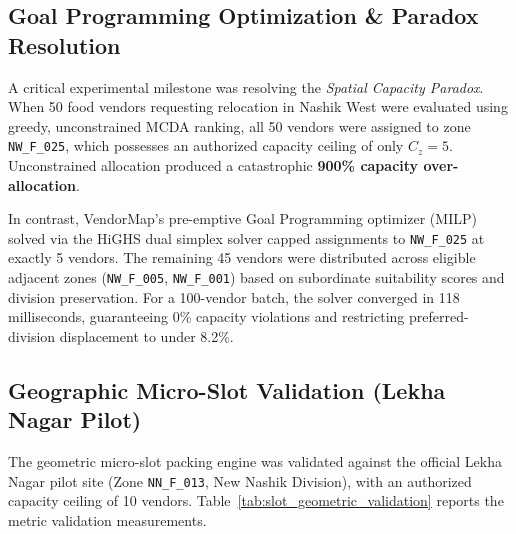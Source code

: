 \begin{graph}[htbp]
\centering
{}
\caption{Observed frequency distribution of zone rank displacements under 224 weight perturbation scenarios ($\delta = 0.20$), highlighting extreme stability around zero rank displacement.}
\label{grp:mcda_sensitivity_dist}
\end{graph}

\subsection{Goal Programming Optimization \& Paradox Resolution}
A critical experimental milestone was resolving the \textit{Spatial Capacity Paradox}. When 50 food vendors requesting relocation in Nashik West were evaluated using greedy, unconstrained MCDA ranking, all 50 vendors were assigned to zone \texttt{NW\_F\_025}, which possesses an authorized capacity ceiling of only $C_z = 5$. Unconstrained allocation produced a catastrophic \textbf{900\% capacity over-allocation}.

In contrast, VendorMap's pre-emptive Goal Programming optimizer (MILP) solved via the HiGHS dual simplex solver capped assignments to \texttt{NW\_F\_025} at exactly 5 vendors. The remaining 45 vendors were distributed across eligible adjacent zones (\texttt{NW\_F\_005}, \texttt{NW\_F\_001}) based on subordinate suitability scores and division preservation. For a 100-vendor batch, the solver converged in 118 milliseconds, guaranteeing 0\% capacity violations and restricting preferred-division displacement to under 8.2\%.

\subsection{Geographic Micro-Slot Validation (Lekha Nagar Pilot)}
The geometric micro-slot packing engine was validated against the official Lekha Nagar pilot site (Zone \texttt{NN\_F\_013}, New Nashik Division), with an authorized capacity ceiling of 10 vendors. Table~\ref{tab:slot_geometric_validation} reports the metric validation measurements.

